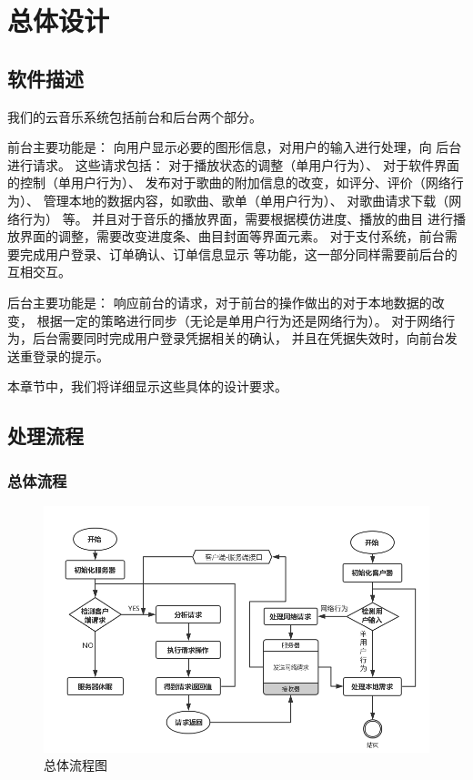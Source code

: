 
\chapter{总体设计}
\section{软件描述}
我们的云音乐系统包括前台和后台两个部分。

前台主要功能是：
向用户显示必要的图形信息，对用户的输入进行处理，向
后台进行请求。
这些请求包括：
对于播放状态的调整（单用户行为）、
对于软件界面的控制（单用户行为）、
发布对于歌曲的附加信息的改变，如评分、评价（网络行为）、
管理本地的数据内容，如歌曲、歌单（单用户行为）、
对歌曲请求下载（网络行为）
等。
并且对于音乐的播放界面，需要根据模仿进度、播放的曲目
进行播放界面的调整，需要改变进度条、曲目封面等界面元素。
对于支付系统，前台需要完成用户登录、订单确认、订单信息显示
等功能，这一部分同样需要前后台的互相交互。

后台主要功能是：
响应前台的请求，对于前台的操作做出的对于本地数据的改变，
根据一定的策略进行同步（无论是单用户行为还是网络行为）。
对于网络行为，后台需要同时完成用户登录凭据相关的确认，
并且在凭据失效时，向前台发送重登录的提示。

本章节中，我们将详细显示这些具体的设计要求。

\newpage
\section{处理流程}
\subsection{总体流程}

\begin{figure}[h]
\centering
\includegraphics[width=15cm]{images/do_1}
\caption{总体流程图}
\end{figure}

